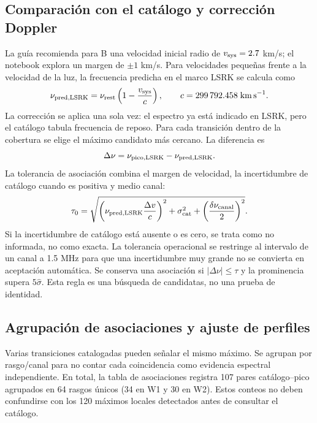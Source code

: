 \documentclass[10pt]{article}
\begin{document}
\subsection{Comparación con el catálogo y corrección Doppler}
La guía recomienda para B una velocidad inicial radio de $v_{\rm sys}=2.7$ km/s; el notebook explora un margen de $\pm1$ km/s. Para velocidades pequeñas frente a la velocidad de la luz, la frecuencia predicha en el marco LSRK se calcula como
\begin{equation}
\nu_{\rm pred,LSRK}=\nu_{\rm rest}\left(1-\frac{v_{\rm sys}}{c}\right),\qquad c=299\,792.458\;\mathrm{km\,s^{-1}}.
\end{equation}
La corrección se aplica una sola vez: el espectro ya está indicado en LSRK, pero el catálogo tabula frecuencia de reposo. Para cada transición dentro de la cobertura se elige el máximo candidato más cercano. La diferencia es
\begin{equation}
\Delta\nu=\nu_{\rm pico,LSRK}-\nu_{\rm pred,LSRK}.
\end{equation}
La tolerancia de asociación combina el margen de velocidad, la incertidumbre de catálogo cuando es positiva y medio canal:
\begin{equation}
\tau_0=\sqrt{\left(\nu_{\rm pred,LSRK}\frac{\Delta v}{c}\right)^2+
\sigma_{\rm cat}^{2}+\left(\frac{\delta\nu_{\rm canal}}{2}\right)^2}.
\end{equation}
Si la incertidumbre de catálogo está ausente o es cero, se trata como no informada, no como exacta. La tolerancia operacional se restringe al intervalo de un canal a 1.5 MHz para que una incertidumbre muy grande no se convierta en aceptación automática. Se conserva una asociación si $|\Delta\nu|\leq\tau$ y la prominencia supera $5\widehat{\sigma}$. Esta regla es una búsqueda de candidatas, no una prueba de identidad.

\subsection{Agrupación de asociaciones y ajuste de perfiles}
Varias transiciones catalogadas pueden señalar el mismo máximo. Se agrupan por rasgo/canal para no contar cada coincidencia como evidencia espectral independiente. En total, la tabla de asociaciones registra 107 pares catálogo--pico agrupados en 64 rasgos únicos (34 en W1 y 30 en W2). Estos conteos no deben confundirse con los 120 máximos locales detectados antes de consultar el catálogo.
\end{document}
